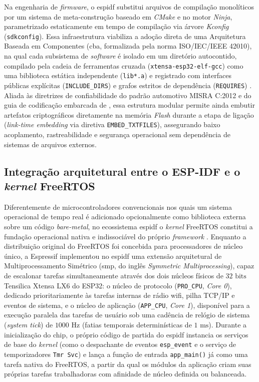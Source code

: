 \documentclass[
	12pt,				%
	openright,			%
	twoside,			%
	a4paper,			%
	english,			%
	brazil				%
	]{abntex2}
\begin{document}
Na engenharia de \textit{firmware}, o \acrshort{espidf} substitui arquivos de compilação
monolíticos por um sistema de meta-construção baseado em \textit{CMake} e no motor
\textit{Ninja}, parametrizado estaticamente em tempo de compilação via árvore
\textit{Kconfig} (\texttt{sdkconfig}). Essa infraestrutura viabiliza a adoção direta de
uma Arquitetura Baseada em Componentes (\acrshort{cba}, formalizada pela norma
ISO/IEC/IEEE 42010), na qual cada subsistema de \textit{software} é isolado em um
diretório autocontido, compilado pela cadeia de ferramentas cruzada
(\texttt{xtensa-esp32-elf-gcc}) como uma biblioteca estática independente
(\texttt{lib*.a}) e registrado com interfaces públicas explícitas
(\texttt{INCLUDE\_DIRS}) e grafos estritos de dependência (\texttt{REQUIRES})
\cite{iso42010}. Aliada às diretrizes de confiabilidade do padrão automotivo MISRA
C:2012 e do guia de codificação embarcada de , essa estrutura
modular permite ainda embutir artefatos criptográficos diretamente na memória
\textit{Flash} durante a etapa de ligação (\textit{link-time embedding} via diretiva
\texttt{EMBED\_TXTFILES}), assegurando baixo acoplamento, rastreabilidade e segurança
operacional sem dependência de sistemas de arquivos externos.

\subsection{Integração arquitetural entre o ESP-IDF e o \textit{kernel}
FreeRTOS}\label{sec:integracao_freertos}

Diferentemente de microcontroladores convencionais nos quais um sistema operacional de
tempo real é adicionado opcionalmente como biblioteca externa sobre um código
\textit{bare-metal}, no ecossistema \acrshort{espidf} o \textit{kernel} FreeRTOS
constitui a fundação operacional nativa e indissociável do próprio \textit{framework}
\cite{espressif2026}. Enquanto a distribuição original do FreeRTOS foi concebida para
processadores de núcleo único, a Espressif implementou no \acrshort{espidf} uma extensão
arquitetural de Multiprocessamento Simétrico (\acrshort{smp}, do inglês
\textit{Symmetric Multiprocessing}), capaz de escalonar tarefas simultaneamente através
dos dois núcleos físicos de $32\text{ bits}$ Tensilica Xtensa LX6 do ESP32: o núcleo de
protocolo (\texttt{PRO\_CPU}, \textit{Core 0}), dedicado prioritariamente às tarefas
internas de rádio \acrshort{wifi}, pilha TCP/IP e eventos de sistema, e o núcleo de
aplicação (\texttt{APP\_CPU}, \textit{Core 1}), disponível para a execução paralela das
tarefas de usuário sob uma cadência de relógio de sistema (\textit{system tick}) de
$1000\text{ Hz}$ (fatias temporais determinísticas de $1\text{ ms}$). Durante a
inicialização do chip, o próprio código de partida do \acrshort{espidf} instancia os
serviços de base do \textit{kernel} (como o despachante de eventos \texttt{esp\_event} e
o serviço de temporizadores \texttt{Tmr Svc}) e lança a função de entrada
\texttt{app\_main()} já como uma tarefa nativa do FreeRTOS, a partir da qual os módulos
da aplicação criam suas próprias tarefas trabalhadoras com afinidade de núcleo definida
ou balanceada.
\end{document}
